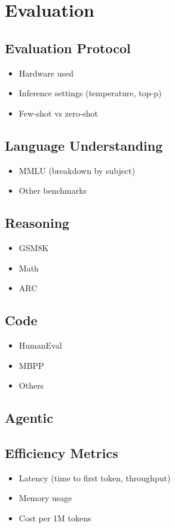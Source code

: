 \section{Evaluation}

\subsection{Evaluation Protocol}
    \begin{itemize}
        \item Hardware used
        \item Inference settings (temperature, top-p)
        \item Few-shot vs zero-shot
    \end{itemize}

\subsection{Language Understanding}
    \begin{itemize}
        \item MMLU (breakdown by subject)
        \item Other benchmarks
    \end{itemize}

\subsection{Reasoning}
    \begin{itemize}
        \item GSM8K
        \item Math
        \item ARC
    \end{itemize}

\subsection{Code}
    \begin{itemize}
        \item HumanEval
        \item MBPP
        \item Others
    \end{itemize}

\subsection{Agentic}

\subsection{Efficiency Metrics}
    \begin{itemize}
        \item Latency (time to first token, throughput)
        \item Memory usage
        \item Cost per 1M tokens
    \end{itemize}
    
